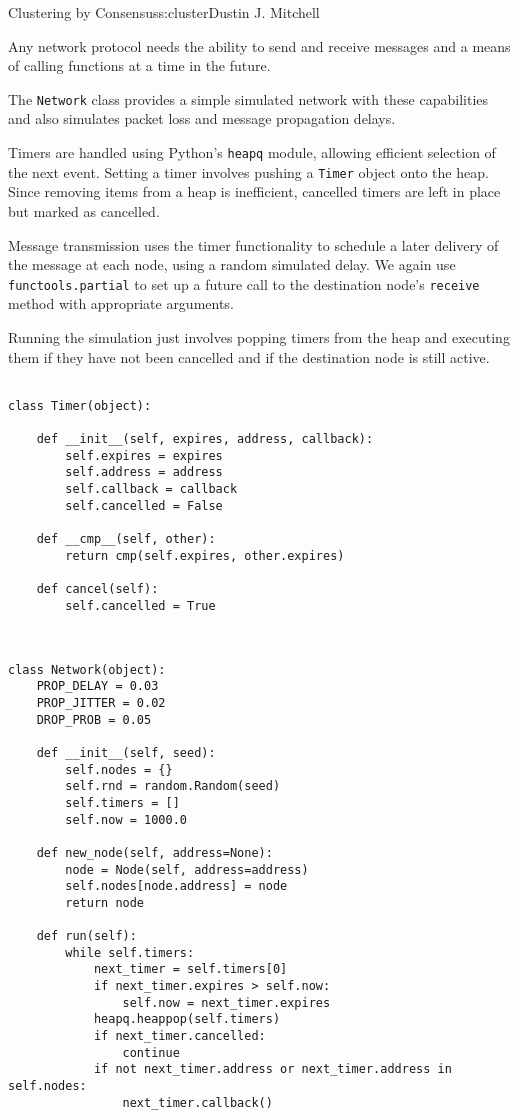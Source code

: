 \begin{aosachapter}{Clustering by Consensus}{s:cluster}{Dustin J. Mitchell}
\label{network}

Any network protocol needs the ability to send and receive messages and
a means of calling functions at a time in the future.

The \texttt{Network} class provides a simple simulated network with
these capabilities and also simulates packet loss and message
propagation delays.

Timers are handled using Python's \texttt{heapq} module, allowing
efficient selection of the next event. Setting a timer involves pushing
a \texttt{Timer} object onto the heap. Since removing items from a heap
is inefficient, cancelled timers are left in place but marked as
cancelled.

Message transmission uses the timer functionality to schedule a later
delivery of the message at each node, using a random simulated delay. We
again use \texttt{functools.partial} to set up a future call to the
destination node's \texttt{receive} method with appropriate arguments.

Running the simulation just involves popping timers from the heap and
executing them if they have not been cancelled and if the destination
node is still active.

\begin{verbatim}

class Timer(object):

    def __init__(self, expires, address, callback):
        self.expires = expires
        self.address = address
        self.callback = callback
        self.cancelled = False

    def __cmp__(self, other):
        return cmp(self.expires, other.expires)

    def cancel(self):
        self.cancelled = True
    
\end{verbatim}

\begin{verbatim}

class Network(object):
    PROP_DELAY = 0.03
    PROP_JITTER = 0.02
    DROP_PROB = 0.05

    def __init__(self, seed):
        self.nodes = {}
        self.rnd = random.Random(seed)
        self.timers = []
        self.now = 1000.0

    def new_node(self, address=None):
        node = Node(self, address=address)
        self.nodes[node.address] = node
        return node

    def run(self):
        while self.timers:
            next_timer = self.timers[0]
            if next_timer.expires > self.now:
                self.now = next_timer.expires
            heapq.heappop(self.timers)
            if next_timer.cancelled:
                continue
            if not next_timer.address or next_timer.address in self.nodes:
                next_timer.callback()


\end{verbatim}
\end{aosachapter}
